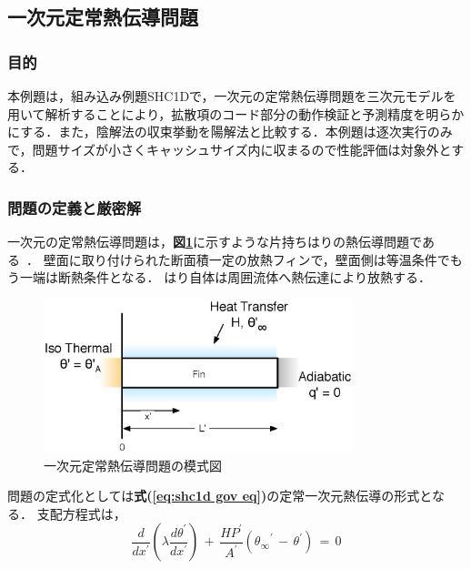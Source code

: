 
\graphicspath{{./fig_shc1d/}}

\subsection{一次元定常熱伝導問題}

%
\subsubsection{目的}
本例題は，組み込み例題SHC1Dで，一次元の定常熱伝導問題を三次元モデルを用いて解析することにより，拡散項のコード部分の動作検証と予測精度を明らかにする．また，陰解法の収束挙動を陽解法と比較する．本例題は逐次実行のみで，問題サイズが小さくキャッシュサイズ内に収まるので性能評価は対象外とする．

%
\subsubsection{問題の定義と厳密解}
一次元の定常熱伝導問題は，\textbf{図\ref{fig:HC1D}}に示すような片持ちはりの熱伝導問題である~\cite{pat:91}．
壁面に取り付けられた断面積一定の放熱フィンで，壁面側は等温条件でもう一端は断熱条件となる．
はり自体は周囲流体へ熱伝達により放熱する．

\begin{figure}[htdp]
\begin{center}
\includegraphics[width=9cm,clip]{1DHC.eps}
\end{center}
\caption{一次元定常熱伝導問題の模式図}
\label{fig:HC1D}
\end{figure}

問題の定式化としては\textbf{式(\ref{eq:shc1d gov eq})}の定常一次元熱伝導の形式となる．
支配方程式は，
\begin{equation}
\frac{d}{d{x}^{\prime}} \left({ \lambda \frac{d \theta^{\prime}}{d{x}^{\prime}} }\right) \,+\,\frac{H P^{\prime}}{A^{\prime}} \left({ {\theta_{\infty}}^{\prime} \,{-}\, \theta^{\prime} }\right)
\,{=}\,{0}
\label{eq:shc1d gov eq}
\end{equation}

